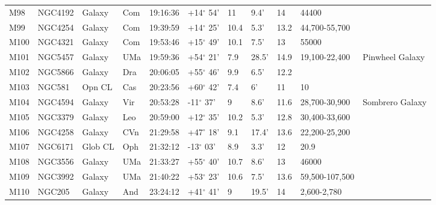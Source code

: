\documentclass[10pt,twoside,a4paper,english]{article}
\begin{document}
\begin{longtable}{@{}lllllllllll@{}}
M98        & NGC4192     & Galaxy     & Com       & 19:16:36 & +14$^{\circ}$ 54'  & 11        & 9.4'                 & 14       & 44400               &                                           \\ 
M99        & NGC4254     & Galaxy     & Com       & 19:39:59 & +14$^{\circ}$ 25'  & 10.4      & 5.3'                 & 13.2     & 44,700-55,700       &                                           \\ 
M100       & NGC4321     & Galaxy     & Com       & 19:53:46 & +15$^{\circ}$ 49'  & 10.1      & 7.5'                 & 13       & 55000               &                                           \\ 
M101       & NGC5457     & Galaxy     & UMa       & 19:59:36 & +54$^{\circ}$ 21'  & 7.9       & 28.5'                & 14.9     & 19,100-22,400       & Pinwheel Galaxy                           \\ 
M102       & NGC5866     & Galaxy     & Dra       & 20:06:05 & +55$^{\circ}$ 46'  & 9.9       & 6.5'                 & 12.2     &                     &                                           \\ 
M103       & NGC581      & Opn CL     & Cas       & 20:23:56 & +60$^{\circ}$ 42'  & 7.4       & 6'                   & 11       & 10                  &                                           \\ 
M104       & NGC4594     & Galaxy     & Vir       & 20:53:28 & -11$^{\circ}$ 37'  & 9         & 8.6'                 & 11.6     & 28,700-30,900       & Sombrero Galaxy                           \\ 
M105       & NGC3379     & Galaxy     & Leo       & 20:59:00 & +12$^{\circ}$ 35'  & 10.2      & 5.3'                 & 12.8     & 30,400-33,600       &                                           \\ 
M106       & NGC4258     & Galaxy     & CVn       & 21:29:58 & +47$^{\circ}$ 18'  & 9.1       & 17.4'                & 13.6     & 22,200-25,200       &                                           \\ 
M107       & NGC6171     & Glob CL    & Oph       & 21:32:12 & -13$^{\circ}$ 03'  & 8.9       & 3.3'                 & 12       & 20.9                &                                           \\ 
M108       & NGC3556     & Galaxy     & UMa       & 21:33:27 & +55$^{\circ}$ 40'  & 10.7      & 8.6'                 & 13       & 46000               &                                           \\ 
M109       & NGC3992     & Galaxy     & UMa       & 21:40:22 & +53$^{\circ}$ 23'  & 10.6      & 7.5'                 & 13.6     & 59,500-107,500      &                                           \\ 
M110       & NGC205      & Galaxy     & And       & 23:24:12 & +41$^{\circ}$ 41'  & 9         & 19.5'                & 14       & 2,600-2,780         &                                           \\ 
\hline 
\end{longtable} 
 
\end{document}
